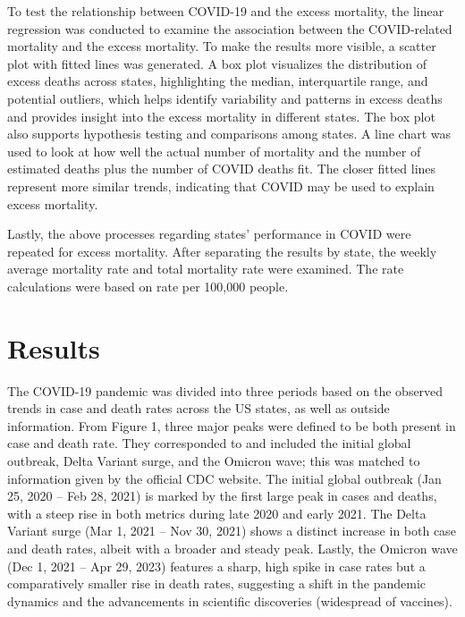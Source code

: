 \documentclass[
  letterpaper,
  DIV=11,
  numbers=noendperiod]{scrartcl}
\begin{document}
To test the relationship between COVID-19 and the excess mortality, the
linear regression was conducted to examine the association between the
COVID-related mortality and the excess mortality. To make the results
more visible, a scatter plot with fitted lines was generated. A box plot
visualizes the distribution of excess deaths across states, highlighting
the median, interquartile range, and potential outliers, which helps
identify variability and patterns in excess deaths and provides insight
into the excess mortality in different states. The box plot also
supports hypothesis testing and comparisons among states. A line chart
was used to look at how well the actual number of mortality and the
number of estimated deaths plus the number of COVID deaths fit. The
closer fitted lines represent more similar trends, indicating that COVID
may be used to explain excess mortality.

Lastly, the above processes regarding states' performance in COVID were
repeated for excess mortality. After separating the results by state,
the weekly average mortality rate and total mortality rate were
examined. The rate calculations were based on rate per 100,000 people.

\section{Results}\label{results}

The COVID-19 pandemic was divided into three periods based on the
observed trends in case and death rates across the US states, as well as
outside information. From Figure 1, three major peaks were defined to be
both present in case and death rate. They corresponded to and included
the initial global outbreak, Delta Variant surge, and the Omicron wave;
this was matched to information given by the official CDC website. The
initial global outbreak (Jan 25, 2020 -- Feb 28, 2021) is marked by the
first large peak in cases and deaths, with a steep rise in both metrics
during late 2020 and early 2021. The Delta Variant surge (Mar 1, 2021 --
Nov 30, 2021) shows a distinct increase in both case and death rates,
albeit with a broader and steady peak. Lastly, the Omicron wave (Dec 1,
2021 -- Apr 29, 2023) features a sharp, high spike in case rates but a
comparatively smaller rise in death rates, suggesting a shift in the
pandemic dynamics and the advancements in scientific discoveries
(widespread of vaccines).
\end{document}

